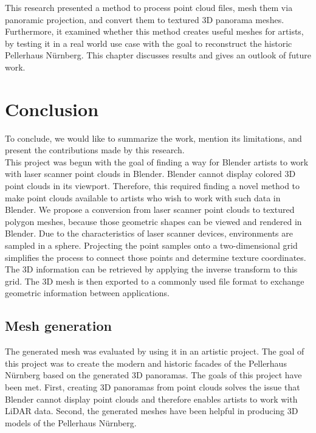 This research presented a method to process point cloud files, mesh them via panoramic projection, and convert them to textured 3D panorama meshes. Furthermore, it examined whether this method creates useful meshes for artists, by testing it in a real world use case with the goal to reconstruct the historic Pellerhaus Nürnberg. This chapter discusses results and gives an outlook of future work.

\section{Conclusion}

To conclude, we would like to summarize the work, mention its limitations, and present the contributions made by this research.\\

This project was begun with the goal of finding a way for Blender artists to work with laser scanner point clouds in Blender. Blender cannot display colored 3D point clouds in its viewport. Therefore, this required finding a novel method to make point clouds available to artists who wish to work with such data in Blender. We propose a conversion from laser scanner point clouds to textured polygon meshes, because those geometric shapes can be viewed and rendered in Blender. Due to the characteristics of laser scanner devices, environments are sampled in a sphere. Projecting the point samples onto a two-dimensional grid simplifies the process to connect those points and determine texture coordinates. The 3D information can be retrieved by applying the inverse transform to this grid. The 3D mesh is then exported to a commonly used file format to exchange geometric information between applications.

\subsection{Mesh generation}

The generated mesh was evaluated by using it in an artistic project. The goal of this project was to create the modern and historic facades of the Pellerhaus Nürnberg based on the generated 3D panoramas. The goals of this project have been met. First, creating 3D panoramas from point clouds solves the issue that Blender cannot display point clouds and therefore enables artists to work with LiDAR data. Second, the generated meshes have been helpful in producing 3D models of the Pellerhaus Nürnberg.\\

